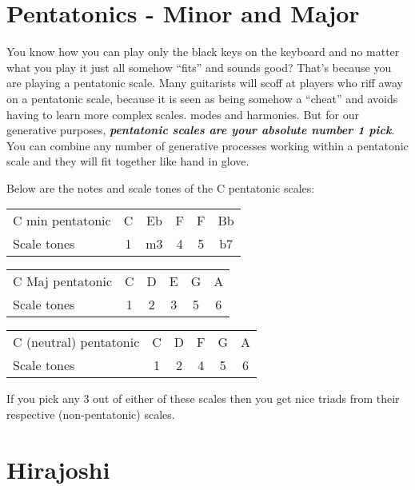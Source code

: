 \documentclass[
  12pt,
  letterpaper,
  oneside,
  open=any]{scrbook}
\begin{document}
\section{Pentatonics - Minor and
Major}\label{pentatonics---minor-and-major}

You know how you can play only the black keys on the keyboard and no
matter what you play it just all somehow ``fits'' and sounds good?
That's because you are playing a pentatonic scale. Many guitarists will
scoff at players who riff away on a pentatonic scale, because it is seen
as being somehow a ``cheat'' and avoids having to learn more complex
scales. modes and harmonies. But for our generative purposes,
\textbf{\emph{pentatonic scales are your absolute number 1 pick}}. You
can combine any number of generative processes working within a
pentatonic scale and they will fit together like hand in glove.

Below are the notes and scale tones of the C pentatonic scales:

\begin{longtable}[]{@{}lccccc@{}}
\toprule\noalign{}
\endhead
\bottomrule\noalign{}
\endlastfoot
C min pentatonic & C & Eb & F & F & Bb \\
Scale tones & 1 & m3 & 4 & 5 & b7 \\
\end{longtable}

\begin{longtable}[]{@{}lccccc@{}}
\toprule\noalign{}
\endhead
\bottomrule\noalign{}
\endlastfoot
C Maj pentatonic & C & D & E & G & A \\
Scale tones & 1 & 2 & 3 & 5 & 6 \\
\end{longtable}

\begin{longtable}[]{@{}lccccc@{}}
\toprule\noalign{}
\endhead
\bottomrule\noalign{}
\endlastfoot
C (neutral) pentatonic & C & D & F & G & A \\
Scale tones & 1 & 2 & 4 & 5 & 6 \\
\end{longtable}

If you pick any 3 out of either of these scales then you get nice triads
from their respective (non-pentatonic) scales.

\section{Hirajoshi}\label{hirajoshi}
\end{document}
